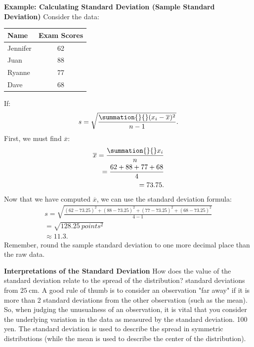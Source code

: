 \documentclass{report}
\begin{document}
        \bigbreak \noindent 
        \pagebreak \bigbreak \noindent
        \begin{mdframed}
          \textbf{Example: Calculating Standard Deviation (Sample Standard Deviation)}
          \bigbreak \noindent 
          Consider the data:
          \begin{center}
              \begin{tabular}{|l|c|}
              \hline
            Name & Exam Scores	 \\
            \hline
            Jennifer & 62 \\  	
            \hline
            Juan & 88 \\
            \hline
            Ryanne & 77 \\
            \hline 
            Dave &  68 \\
            \hline
              \end{tabular}
          \end{center}
          \bigbreak \noindent 
          If:
          \begin{align*}
              s = \sqrt{\frac{\summation{}{}(x_{i} - \overline{x})^{2}}{n-1}}
          .\end{align*}
          \bigbreak \noindent 
          First, we must find $\overline{x}$:
          \begin{align*}
              \overline{x} = \frac{\summation{}{}x_{i}}{n} \\
              = \frac{62 + 88 + 77 + 68}{4} \\
              = 73.75
          .\end{align*}
          \bigbreak \noindent 
          Now that we have computed $\overline{x}$, we can use the standard deviation formula:
          \begin{align*}
              s = \sqrt{\frac{(62-73.25)^{2} + (88-73.25)^{2} + (77-73.25)^{2} + (68-73.25)^{2}}{4-1}} \\
              = \sqrt{128.25\ points^{2}} \\
              \approx  11.3
          .\end{align*}
          \bigbreak \noindent 
          Remember, round the sample standard deviation to one more decimal place than the raw data.
        \end{mdframed}

        \bigbreak \noindent \bigbreak \noindent 
        \textbf{Interpretations of the Standard Deviation}
        \bigbreak \noindent 
        How does the value of the standard deviation relate to the spread of the distribution?
        \bigbreak \noindent 
        standard deviations from $25 \mathrm{~cm}$. A good rule of thumb is to consider an observation "far away" if it is more than 2 standard deviations from the other observation (such as the mean).
        So, when judging the unusualness of an observation, it is vital that you consider the underlying variation in the data as measured by the standard deviation. 100 yen.
        The standard deviation is used to describe the spread in symmetric distributions (while the mean is used to describe the center of the distribution).
        \bigbreak \noindent






    
\end{document}
